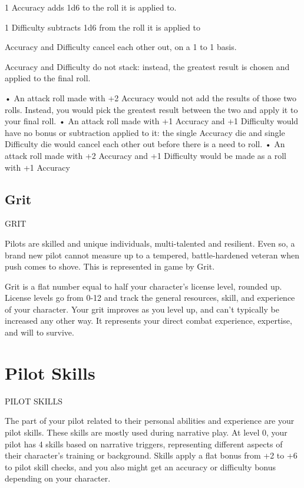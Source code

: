 1 Accuracy adds 1d6 to the roll it is applied to.
 
1 Difficulty subtracts 1d6 from the roll it is applied to
 
Accuracy and Difficulty cancel each other out, on a 1 to 1 basis.
 
Accuracy and Difficulty do not stack: instead, the greatest result is chosen and applied to the  
final roll.  
 
       •  An attack roll made with +2 Accuracy would not add the results of those two rolls.  
          Instead, you would pick the greatest result between the two and apply it to your final roll.  
       •  An attack roll made with +1 Accuracy and +1 Difficulty would have no bonus or  
         subtraction applied to it: the single Accuracy die and single Difficulty die would cancel  
          each other out before there is a need to roll.  
       •  An attack roll made with +2 Accuracy and +1 Difficulty would be made as a roll with +1  
         Accuracy  

\section{Grit}
                                                      GRIT  

Pilots are skilled and unique individuals, multi-talented and resilient. Even so, a brand new pilot  
cannot measure up to a tempered, battle-hardened veteran when push comes to shove. This is  
represented in game by Grit.  

Grit is a flat number equal to half your character’s license level, rounded up. License levels go  
from 0-12 and track the general resources, skill, and experience of your character. Your grit  
improves as you level up, and can’t typically be increased any other way. It represents your direct  
combat experience, expertise, and will to survive.  

\chapter{Pilot Skills}
                                              PILOT SKILLS  

The part of your pilot related to their personal abilities and experience are your pilot skills. These  
skills are mostly used during narrative play. At level 0, your pilot has 4 skills based on narrative  
triggers, representing different aspects of their character’s training or background. Skills apply a  
flat bonus from +2 to +6 to pilot skill checks, and you also might get an accuracy or difficulty  
bonus depending on your character.
 
